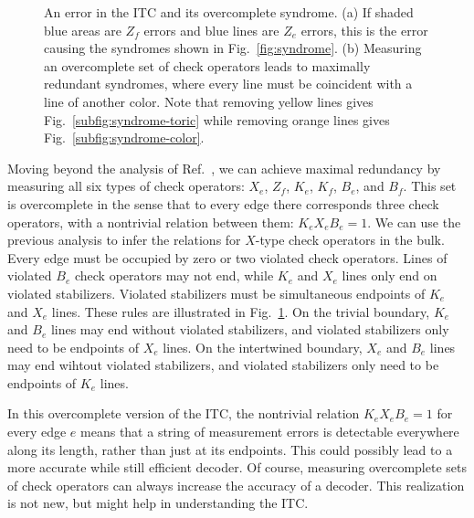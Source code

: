 \begin{figure}[t]
    \centering
    \qquad
    \caption[An error in the ITC and its overcomplete syndrome]{An error in the ITC and its overcomplete syndrome. (a) If shaded blue areas are $Z_f$ errors and blue lines are $Z_e$ errors, this is the error causing the syndromes shown in Fig.~\ref{fig:syndrome}. (b) Measuring an overcomplete set of check operators leads to maximally redundant syndromes, where every line must be coincident with a line of another color. Note that removing yellow lines gives Fig.~\ref{subfig:syndrome-toric} while removing orange lines gives Fig.~\ref{subfig:syndrome-color}.}
    \label{fig:syndrome-overcomplete}
\end{figure}

Moving beyond the analysis of Ref.~\cite{KubicaVasmer2022},
we can achieve maximal redundancy by measuring all six types of check operators: $X_e$, $Z_f$, $K_e$, $K_f$, $B_e$, and $B_f$. This set is overcomplete in the sense that to every edge there corresponds three check operators, with a nontrivial relation between them: $K_e X_e B_e = 1$. We can use the previous analysis to infer the relations for $X$-type check operators in the bulk. Every edge must be occupied by zero or two violated check operators. Lines of violated $B_e$ check operators may not end, while $K_e$ and $X_e$ lines only end on violated stabilizers. Violated stabilizers must be simultaneous endpoints of $K_e$ and $X_e$ lines. These rules are illustrated in Fig.~\ref{fig:syndrome-overcomplete}. On the trivial boundary, $K_e$ and $B_e$ lines may end without violated stabilizers, and violated stabilizers only need to be endpoints of $X_e$ lines. On the intertwined boundary, $X_e$ and $B_e$ lines may end wihtout violated stabilizers, and violated stabilizers only need to be endpoints of $K_e$ lines.

In this overcomplete version of the ITC, the nontrivial relation $K_e X_e B_e = 1$ for every edge $e$ means that a string of measurement errors is detectable everywhere along its length, rather than just at its endpoints. This could possibly lead to a more accurate while still efficient decoder. Of course, measuring overcomplete sets of check operators can always increase the accuracy of a decoder. This realization is not new, but might help in understanding the ITC.

